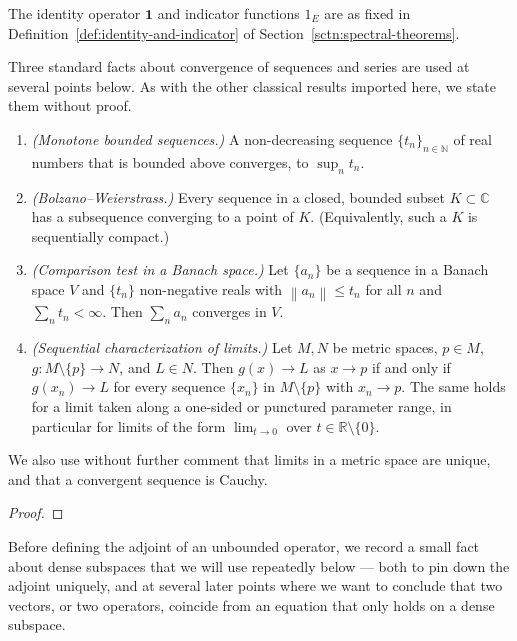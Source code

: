 The identity operator $\mathbf{1}$ and indicator functions $1_E$ are as fixed in Definition~\ref{def:identity-and-indicator} of Section~\ref{sctn:spectral-theorems}.

Three standard facts about convergence of sequences and series are used at several points below. As with the other classical results imported here, we state them without proof.

\begin{proposition}
    \label{prpstn:convergence-facts}
    \leanok
    \begin{enumerate}
        \item \textit{(Monotone bounded sequences.)} A non-decreasing sequence $\{ t_n \}_{n\in\mathbb{N}}$ of real numbers that is bounded above converges, to $\sup_n t_n$.
        \item \textit{(Bolzano–Weierstrass.)} Every sequence in a closed, bounded subset $K \subset \mathbb{C}$ has a subsequence converging to a point of $K$. (Equivalently, such a $K$ is sequentially compact.)
        \item \textit{(Comparison test in a Banach space.)} Let $\{a_n\}$ be a sequence in a Banach space $V$ and $\{t_n\}$ non-negative reals with $\left\| a_n \right\| \le t_n$ for all $n$ and $\sum_n t_n < \infty$. Then $\sum_n a_n$ converges in $V$.
        \item \textit{(Sequential characterization of limits.)} Let $M, N$ be metric spaces, $p \in M$, $g : M \setminus \{p\} \to N$, and $L \in N$. Then $g(x) \to L$ as $x \to p$ if and only if $g(x_n) \to L$ for every sequence $\{x_n\}$ in $M \setminus \{p\}$ with $x_n \to p$. The same holds for a limit taken along a one-sided or punctured parameter range, in particular for limits of the form $\lim_{t \to 0}$ over $t \in \mathbb{R}\setminus\{0\}$.
    \end{enumerate}
    We also use without further comment that limits in a metric space are unique, and that a convergent sequence is Cauchy.
\end{proposition}
\begin{proof}
\leanok
\end{proof}

Before defining the adjoint of an unbounded operator, we record a small fact about dense subspaces that we will use repeatedly below — both to pin down the adjoint uniquely, and at several later points where we want to conclude that two vectors, or two operators, coincide from an equation that only holds on a dense subspace.

